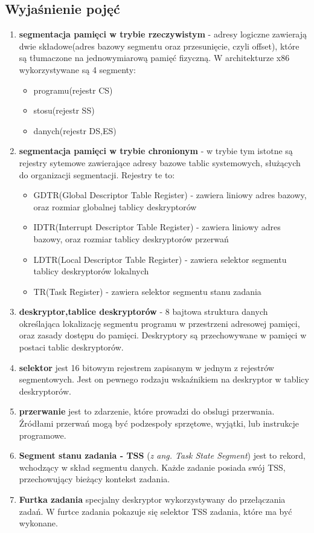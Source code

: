 \documentclass[a4paper,12pt]{article}
\begin{document}
	\subsection{Wyjaśnienie pojęć}
		\begin{enumerate}
				\item{\textbf{segmentacja pamięci w trybie rzeczywistym} - adresy logiczne zawierają dwie składowe(adres bazowy segmentu oraz przesunięcie, czyli offset), które są tłumaczone na jednowymiarową pamięć fizyczną. W architekturze x86 wykorzystywane są 4 segmenty:}
					\begin{itemize}
					\item{programu(rejestr CS)}
					\item{stosu(rejestr SS)}
					\item{danych(rejestr DS,ES)}
					\end{itemize}
				\item{\textbf{segmentacja pamięci w trybie chronionym} - w trybie tym istotne są rejestry sytemowe zawierające adresy bazowe tablic systemowych, służących do organizacji segmentacji. Rejestry te to:}
					\begin{itemize}
						\item{GDTR(Global Descriptor Table Register) - zawiera liniowy adres bazowy, oraz rozmiar globalnej tablicy deskryptorów}
						\item{IDTR(Interrupt Descriptor Table Register) - zawiera liniowy adres bazowy, oraz rozmiar tablicy deskryptorów przerwań}
						\item{LDTR(Local Descriptor Table Register) - zawiera selektor segmentu tablicy deskryptorów lokalnych}
						\item{TR(Task Register) - zawiera selektor segmentu stanu zadania}
					\end{itemize}
				\item {\textbf{deskryptor,tablice deskryptorów }- 8 bajtowa struktura danych określająca lokalizację segmentu programu w przestrzeni adresowej pamięci, oraz zasady dostępu do pamięci. Deskryptory są przechowywane w pamięci w postaci tablic deskryptorów.}
				\item{\textbf{selektor} jest 16 bitowym rejestrem zapisanym w jednym z rejestrów segmentowych. Jest on pewnego rodzaju wskaźnikiem na deskryptor w tablicy deskryptorów.}
					
				\item{\textbf{przerwanie} jest to zdarzenie, które prowadzi do obslugi przerwania. Źródłami przerwań mogą być podzespoły sprzętowe, wyjątki, lub instrukcje programowe. }
				\item{\textbf{Segment stanu zadania - TSS} (\textit{z ang. Task State Segment}) jest to rekord, wchodzący w skład segmentu danych. Każde zadanie posiada swój TSS, przechowujący bieżący kontekst zadania.}
				\item{\textbf{Furtka zadania} specjalny deskryptor wykorzystywany do przełączania zadań. W furtce zadania pokazuje się selektor TSS zadania, które ma być wykonane.} 
		\end{enumerate}
	
\end{document}
